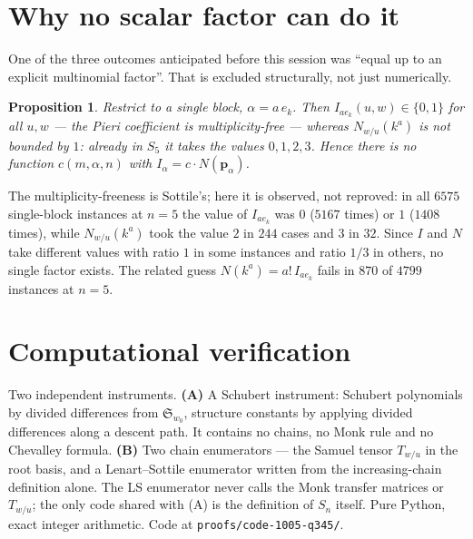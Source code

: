 \documentclass[11pt]{article}
\theoremstyle{plain}
\newtheorem{proposition}[theorem]{Proposition}
\theoremstyle{definition}
\newcommand{\Sch}{\mathfrak{S}}
\newcommand{\pv}{\mathbf{p}}
\begin{document}
\section{Why no scalar factor can do it}\label{sec:discriminator}

One of the three outcomes anticipated before this session was ``equal up to an
explicit multinomial factor''. That is excluded structurally, not just
numerically.

\begin{proposition}\label{prop:discriminator}
Restrict to a single block, $\alpha=a\,e_k$. Then $I_{a e_k}(u,w)\in\{0,1\}$ for
all $u,w$ --- the Pieri coefficient is multiplicity-free --- whereas
$N_{w/u}(k^a)$ is not bounded by $1$: already in $S_5$ it takes the values
$0,1,2,3$. Hence there is no function $c(m,\alpha,n)$ with
$I_\alpha=c\cdot N(\pv_\alpha)$.
\end{proposition}

\noindent The multiplicity-freeness is Sottile's; here it is observed, not
reproved: in all $6575$ single-block instances at $n=5$ the value of
$I_{ae_k}$ was $0$ ($5167$ times) or $1$ ($1408$ times), while $N_{w/u}(k^a)$
took the value $2$ in $244$ cases and $3$ in $32$. Since $I$ and $N$ take
different values with ratio $1$ in some instances and ratio $1/3$ in others,
no single factor exists. The related guess $N(k^a)=a!\,I_{ae_k}$ fails in $870$
of $4799$ instances at $n=5$.

\section{Computational verification}\label{sec:verif}

Two independent instruments. \textbf{(A)} A Schubert instrument: Schubert
polynomials by divided differences from $\Sch_{w_0}$, structure constants by
applying divided differences along a descent path. It contains no chains, no
Monk rule and no Chevalley formula. \textbf{(B)} Two chain enumerators ---
the Samuel tensor $T_{w/u}$ in the root basis, and a Lenart--Sottile enumerator
written from the increasing-chain definition alone. The LS enumerator never
calls the Monk transfer matrices or $T_{w/u}$; the only code shared with (A) is
the definition of $S_n$ itself. Pure Python, exact integer arithmetic.
Code at \texttt{proofs/code-1005-q345/}.
\end{document}
